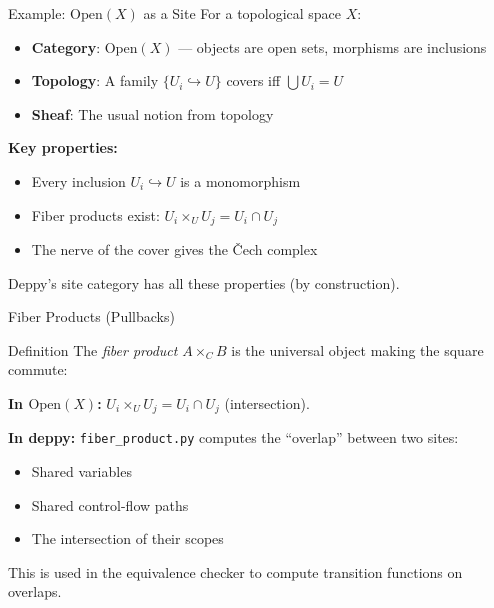 \documentclass[aspectratio=169,10pt]{beamer}
\newcommand{\Open}{\mathrm{Open}}
\begin{document}
\begin{frame}{Example: $\Open(X)$ as a Site}
For a topological space $X$:
\begin{itemize}
  \item \textbf{Category}: $\Open(X)$ --- objects are open sets, morphisms are inclusions
  \item \textbf{Topology}: A family $\{U_i \hookrightarrow U\}$ covers iff $\bigcup U_i = U$
  \item \textbf{Sheaf}: The usual notion from topology
\end{itemize}

\textbf{Key properties:}
\begin{itemize}
  \item Every inclusion $U_i \hookrightarrow U$ is a monomorphism
  \item Fiber products exist: $U_i \times_U U_j = U_i \cap U_j$
  \item The nerve of the cover gives the \v{C}ech complex
\end{itemize}

\vspace{0.3em}
Deppy's site category has all these properties (by construction).
\end{frame}

\begin{frame}[fragile]{Fiber Products (Pullbacks)}
\begin{block}{Definition}
The \emph{fiber product} $A \times_C B$ is the universal object making the square commute:
\end{block}

\begin{center}
\end{center}

\textbf{In $\Open(X)$:} $U_i \times_U U_j = U_i \cap U_j$ (intersection).

\textbf{In deppy:} \texttt{fiber\_product.py} computes the ``overlap'' between two sites:
\begin{itemize}
  \item Shared variables
  \item Shared control-flow paths
  \item The intersection of their scopes
\end{itemize}

This is used in the equivalence checker to compute transition functions on overlaps.
\end{frame}
\end{document}
